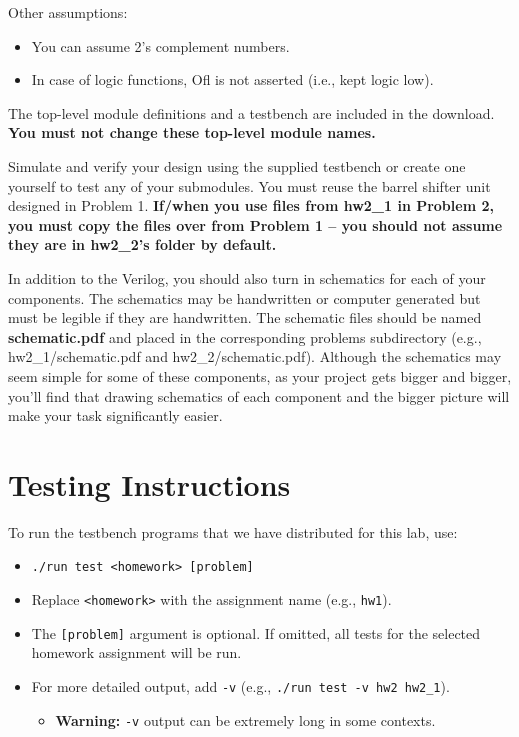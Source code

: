 \documentclass[12pt]{article}
\begin{document}
Other assumptions:
\begin{itemize}
\item You can assume 2's complement numbers.
\item In case of logic functions, Ofl is not asserted (i.e., kept logic low).
\end{itemize}

The top-level module definitions and a testbench are included in the download.  
\textbf{You must not change these top-level module names.}

Simulate and verify your design using the supplied testbench or create one yourself to test any of your
submodules. You must reuse the barrel shifter unit designed in Problem 1. \textbf{If/when you use files from
hw2\_1 in Problem 2, you must copy the files over from Problem 1 – you should not assume they are
in hw2\_2’s folder by default.}

In addition to the Verilog, you should also turn in schematics for each of your components. The schematics
may be handwritten or computer generated but must be legible if they are handwritten. The schematic files
should be named \textbf{schematic.pdf} and placed in the corresponding problems subdirectory (e.g.,
hw2\_1/schematic.pdf and hw2\_2/schematic.pdf). Although the schematics may seem simple for some of
these components, as your project gets bigger and bigger, you’ll find that drawing schematics of each
component and the bigger picture will make your task significantly easier.

\section*{Testing Instructions}

To run the testbench programs that we have distributed for this lab, use:
\begin{itemize}
\item \texttt{./run test <homework> [problem]}
\item Replace \texttt{<homework>} with the assignment name (e.g., \texttt{hw1}).
\item The \texttt{[problem]} argument is optional. If omitted, all tests for the selected homework assignment will be run.
\item For more detailed output, add \texttt{-v} (e.g., \texttt{./run test -v hw2 hw2\_1}).
\begin{itemize}
\item \textbf{Warning:} \texttt{-v} output can be extremely long in some contexts.
\end{itemize}
\end{itemize}
\end{document}

